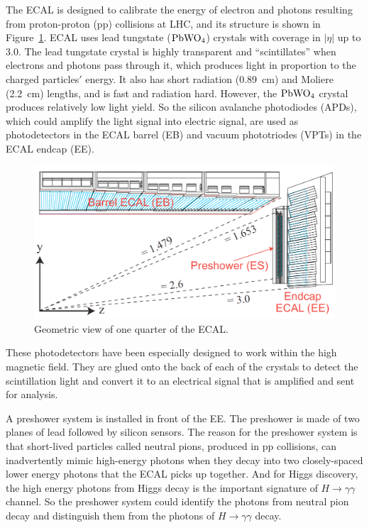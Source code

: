 The ECAL is designed to calibrate the energy of electron and photons resulting from proton-proton (pp) collisions at LHC, and its structure is shown in Figure~\ref{fig:ECAL}.  
ECAL uses lead tungstate (${\rm PbWO_4}$) crystals with coverage in $|\eta|$ up to 3.0. 
The lead tungstate crystal is highly transparent and ``scintillates'' when electrons and photons pass through it, which produces light in proportion to the charged particles$'$ energy. It also has short radiation (0.89~cm) and Moliere (2.2~cm) lengths, and is fast and radiation hard. However, 
the ${\rm PbWO_4}$ crystal produces relatively low light yield.
So the silicon avalanche photodiodes (APDs), which could amplify the light signal into electric signal, are used as photodetectors in the ECAL barrel (EB) and 
vacuum phototriodes (VPTs) in the ECAL endcap (EE). 
 
 
\begin{figure}[!htbp]
\centering
\includegraphics[width=.8\textwidth]{figures/ECALEta.png}
\caption{Geometric view of one quarter of the ECAL.}
\label{fig:ECAL}
\end{figure}

  
These photodetectors have been especially designed to work within the high magnetic field. They are glued onto the back of each of the crystals to detect the scintillation light and convert it to an electrical signal that is amplified and sent for analysis.
 
 A preshower system is installed in front of the EE.  
The preshower is made of two planes of lead followed by silicon sensors. 
The reason for the preshower system is that short-lived particles called neutral pions, produced in pp collisions, can inadvertently mimic high-energy photons when they decay into two closely-spaced lower energy photons that the ECAL picks up together. And for Higgs discovery,
the high energy photons from Higgs decay is the important signature of $H \to \gamma \gamma$ channel. So the preshower system could identify the photons from neutral pion decay and distinguish them from the photons of $H \to \gamma \gamma$  decay.
  


